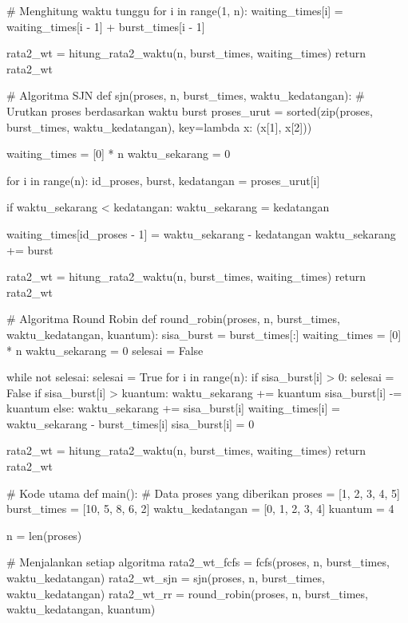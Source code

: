 \documentclass[12pt]{article}
\begin{document}
\begin{itemize}
\begin{python}
    # Menghitung waktu tunggu
    for i in range(1, n):
        waiting_times[i] = waiting_times[i - 1] + burst_times[i - 1]

    rata2_wt = hitung_rata2_waktu(n, burst_times, waiting_times)
    return rata2_wt

# Algoritma SJN
def sjn(proses, n, burst_times, waktu_kedatangan):
    # Urutkan proses berdasarkan waktu burst
    proses_urut = sorted(zip(proses, burst_times, waktu_kedatangan), key=lambda x: (x[1], x[2]))
    
    waiting_times = [0] * n
    waktu_sekarang = 0
    
    for i in range(n):
        id_proses, burst, kedatangan = proses_urut[i]
        
        if waktu_sekarang < kedatangan:
            waktu_sekarang = kedatangan
        
        waiting_times[id_proses - 1] = waktu_sekarang - kedatangan
        waktu_sekarang += burst

    rata2_wt = hitung_rata2_waktu(n, burst_times, waiting_times)
    return rata2_wt

# Algoritma Round Robin
def round_robin(proses, n, burst_times, waktu_kedatangan, kuantum):
    sisa_burst = burst_times[:]  
    waiting_times = [0] * n
    waktu_sekarang = 0
    selesai = False
    
    while not selesai:
        selesai = True
        for i in range(n):
            if sisa_burst[i] > 0:
                selesai = False
                if sisa_burst[i] > kuantum:
                    waktu_sekarang += kuantum
                    sisa_burst[i] -= kuantum
                else:
                    waktu_sekarang += sisa_burst[i]
                    waiting_times[i] = waktu_sekarang -
                    burst_times[i]
                    sisa_burst[i] = 0

    rata2_wt = hitung_rata2_waktu(n, burst_times, waiting_times)
    return rata2_wt

# Kode utama
def main():
    # Data proses yang diberikan
    proses = [1, 2, 3, 4, 5]
    burst_times = [10, 5, 8, 6, 2]
    waktu_kedatangan = [0, 1, 2, 3, 4]
    kuantum = 4

    n = len(proses)

    # Menjalankan setiap algoritma
    rata2_wt_fcfs = fcfs(proses, n, burst_times, waktu_kedatangan)
    rata2_wt_sjn = sjn(proses, n, burst_times, waktu_kedatangan)
    rata2_wt_rr = round_robin(proses, n, burst_times, waktu_kedatangan, kuantum)


\end{python}
\end{itemize}
\end{document}
